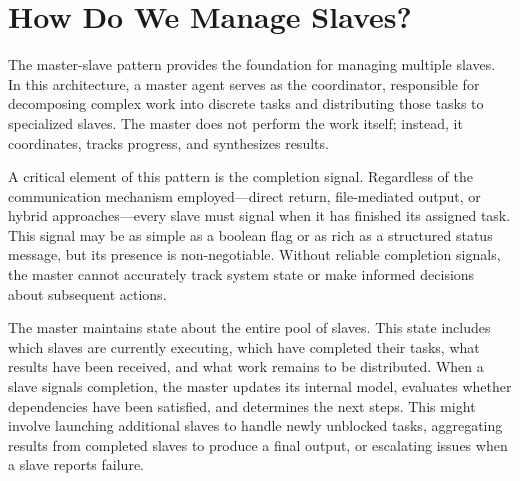 \section{How Do We Manage Slaves?}\label{sec:manage}

The master-slave pattern provides the foundation for managing multiple slaves. In this architecture, a master agent serves as the coordinator, responsible for decomposing complex work into discrete tasks and distributing those tasks to specialized slaves. The master does not perform the work itself; instead, it coordinates, tracks progress, and synthesizes results.

A critical element of this pattern is the completion signal. Regardless of the communication mechanism employed—direct return, file-mediated output, or hybrid approaches—every slave must signal when it has finished its assigned task. This signal may be as simple as a boolean flag or as rich as a structured status message, but its presence is non-negotiable. Without reliable completion signals, the master cannot accurately track system state or make informed decisions about subsequent actions.

The master maintains state about the entire pool of slaves. This state includes which slaves are currently executing, which have completed their tasks, what results have been received, and what work remains to be distributed. When a slave signals completion, the master updates its internal model, evaluates whether dependencies have been satisfied, and determines the next steps. This might involve launching additional slaves to handle newly unblocked tasks, aggregating results from completed slaves to produce a final output, or escalating issues when a slave reports failure.

